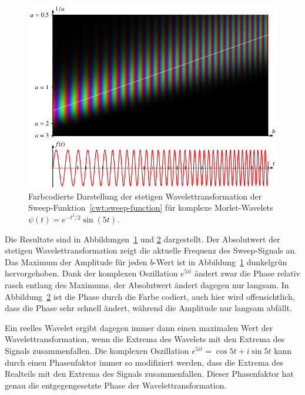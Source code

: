 \begin{beispiel}
\begin{figure}
{\label{cwt:sweep-cwt-abs-phase}}
\end{figure}
\begin{figure}
\centering
\includegraphics[width=\hsize]{chapters/4-cwt/images/sweep.pdf}
\caption{Farbcodierte Darstellung der stetigen Wavelettransformation
der Sweep-Funktion~\eqref{cwt:sweep-function}
für komplexe Morlet-Wavelets $\psi(t) = e^{-t^2/2} \sin(5t)$.
\label{cwt:sweep-cwt-color}}
\end{figure}
Die Resultate sind in Abbildungen~\ref{cwt:sweep-cwt-abs-phase} und
\ref{cwt:sweep-cwt-color} dargestellt.
Der Absolutwert der stetigen Wavelettransformation zeigt die aktuelle
Frequenz des Sweep-Signals an.
Das Maximum der Amplitude für jeden $b$-Wert ist in
Abbildung~\ref{cwt:sweep-cwt-abs-phase} dunkelgrün hervorgehoben.
Dank der komplexen Oszillation $e^{5it}$ ändert zwar die Phase relativ
rasch entlang des Maximums, der Absolutwert ändert dagegen nur 
langsam.
In Abbildung~\ref{cwt:sweep-cwt-color} ist die Phase durch die Farbe
codiert, auch hier wird offensichtlich, dass die Phase sehr schnell ändert,
während die Amplitude nur langsam abfällt.

Ein reelles Wavelet ergibt dagegen immer dann einen maximalen Wert der
Wavelettransformation, wenn die Extrema des Wavelets mit den Extrema
des Signals zusammenfallen.
Die komplexen Oszillation $e^{5it}=\cos 5t + i\sin 5t$ kann durch einen
Phasenfaktor immer so modifiziert werden, dass die Extrema des Realteils
mit den Extrema des Signals zusammenfallen.
Dieser Phasenfaktor hat genau die entgegengesetzte Phase der
Wavelettransformation.
\end{beispiel}
